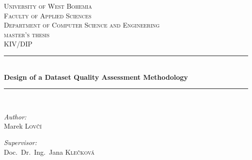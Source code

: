 \linespread{1}

\begin{titlepage}

    \newcommand{\HRule}{\rule{\linewidth}{0.5mm}} %

    \center{} %


    \textsc{\LARGE University of West Bohemia}\\[.5cm] %
    \textsc{\Large Faculty of Applied Sciences}\\[.5cm] %
    \textsc{\Large Department of Computer Science and Engineering}\\[1.5cm] %

    \textsc{\Large master's thesis}\\[0.5cm] %
    \textsc{\large KIV/DIP}\\[0.5cm] %


    \HRule{} \\[0.4cm]
    {\huge \bfseries Design of a Dataset Quality Assessment Methodology}\\ %
    \HRule{} \\[1.5cm]


    \begin{minipage}[t]{0.4\textwidth}
        \begin{flushleft}
            \large \emph{Author:}\\
            Marek \textsc{Lovčí}
        \end{flushleft}
    \end{minipage}
    \begin{minipage}[t]{0.4\textwidth}
        \begin{flushright}
            \large \emph{Supervisor:}\\
            Doc.\ Dr.\ Ing.\ Jana \textsc{Klečková}
        \end{flushright}
    \end{minipage}\\[5.5cm] %


\end{titlepage}

